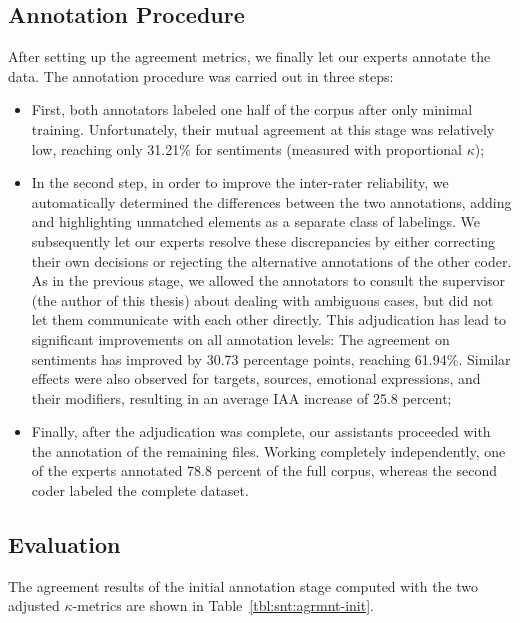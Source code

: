 \subsection{Annotation Procedure}\label{sec:astages}
After setting up the agreement metrics, we finally let our experts
annotate the data.  The annotation procedure was carried out in three
steps:
\begin{itemize}
  \item First, both annotators labeled one half of the corpus after
    only minimal training.  Unfortunately, their mutual agreement at
    this stage was relatively low, reaching only 31.21\% for
    sentiments (measured with proportional $\kappa$);
  \item In the second step, in order to improve the inter-rater
    reliability, we automatically determined the differences between
    the two annotations, adding and highlighting unmatched elements as
    a separate class of labelings. We subsequently let our experts
    resolve these discrepancies by either correcting their own
    decisions or rejecting the alternative annotations of the other
    coder.  As in the previous stage, we allowed the annotators to
    consult the supervisor (the author of this thesis) about dealing
    with ambiguous cases, but did not let them communicate with each
    other directly.  This adjudication has lead to significant
    improvements on all annotation levels: The agreement on sentiments
    has improved by 30.73 percentage points, reaching 61.94\%.
    Similar effects were also observed for targets, sources, emotional
    expressions, and their modifiers, resulting in an average IAA
    increase of 25.8 percent;
  \item Finally, after the adjudication was complete, our assistants
    proceeded with the annotation of the remaining files.  Working
    completely independently, one of the experts annotated 78.8
    percent of the full corpus, whereas the second coder labeled the
    complete dataset.
\end{itemize}

\subsection{Evaluation}\label{sec:eval}
The agreement results of the initial annotation stage computed with
the two adjusted $\kappa$-metrics are shown in
Table~\ref{tbl:snt:agrmnt-init}.

